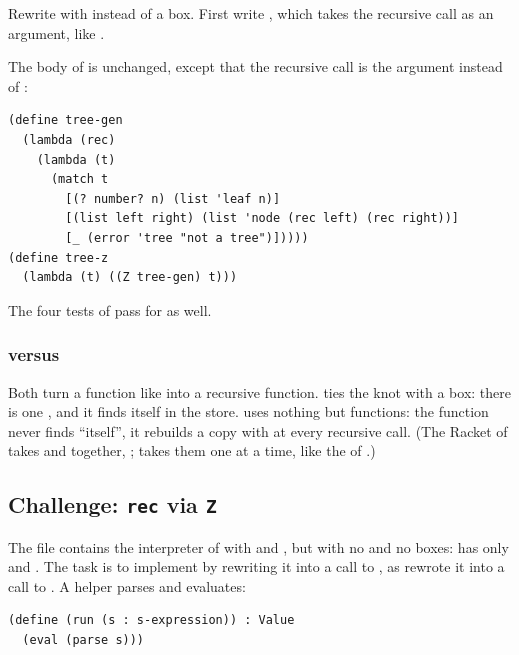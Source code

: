 \begin{exercise}
Rewrite  with  instead of a box. First write , which takes the recursive call as an argument, like .
\end{exercise}
\begin{solution}
The body of  is unchanged, except that the recursive call is the argument  instead of :
\begin{lstlisting}
(define tree-gen
  (lambda (rec)
    (lambda (t)
      (match t
        [(? number? n) (list 'leaf n)]
        [(list left right) (list 'node (rec left) (rec right))]
        [_ (error 'tree "not a tree")]))))
(define tree-z
  (lambda (t) ((Z tree-gen) t)))
\end{lstlisting}
The four tests of  pass for  as well.
\end{solution}

\subsubsection{ versus } Both turn a function like  into a recursive function.  ties the knot with a box: there is one , and it finds itself in the store.  uses nothing but functions: the function never finds ``itself'', it rebuilds a copy with  at every recursive call. (The Racket  of  takes  and  together, ;  takes them one at a time, like the  of .)

\subsection{Challenge: \texttt{rec} via \texttt{Z}}
\label{sec:rec7-interp}

The file  contains the interpreter of  with  and , but with no  and no boxes:  has only  and . The task is to implement  by rewriting it into a call to , as  rewrote it into a call to . A helper  parses and evaluates:
\begin{lstlisting}
(define (run (s : s-expression)) : Value
  (eval (parse s)))
\end{lstlisting}


